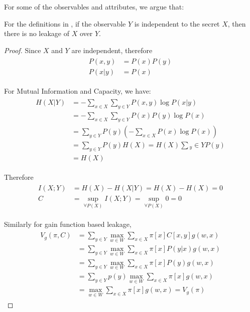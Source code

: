 For some of the observables and attributes, we argue that:

\begin{theorem} \label{Te: IR}
For the definitions in , if the observable $Y$ is independent to the secret $X$, then there is no leakage of $X$ over $Y$.
\end{theorem}

\begin{proof}
	Since $X$ and $Y$ are independent, therefore
	\begin{eqnarray*}
		\begin{aligned}
			P(x,y) &= P(x)P(y) \\
			P(x|y) &= P(x)
		\end{aligned}
	\end{eqnarray*}

	For Mutual Information and Capacity, we have:
	\begin{eqnarray*}
		\begin{aligned}
			H(X|Y) 
			&= - \sum_{x \in X} \sum_{y \in Y} P(x,y)\log{P(x|y)} \\
			&= - \sum_{x \in X} \sum_{y \in Y} P(x)P(y)\log{P(x)} \\
			&= \sum_{y \in Y} P(y) (- \sum_{x \in X}P(x)\log{P(x)}) \\
			&= \sum_{y \in Y} P(y) H(X) = H(X) \sum{_y \in Y} P(y) \\
			&= H(X)
		\end{aligned}
	\end{eqnarray*}
	
	Therefore
	\begin{eqnarray*}
		\begin{aligned}
			I(X;Y) &= H(X) - H(X|Y) = H(X) - H(X) = 0 \\
			C &= \sup_{\forall P(X)} I(X;Y) = \sup_{\forall P(X)} 0 = 0
		\end{aligned}
	\end{eqnarray*}
	
	Similarly for gain function based leakage\cite{GLeakage},
	\begin{eqnarray*}
		\begin{aligned}
			V_{g}(\pi, C) 
			&= \sum_{y \in Y}{\max_{w \in W}\sum_{x \in X}{\pi[x]C[x,y]g(w,x)}} \\
			&= \sum_{y \in Y}{\max_{w \in W}\sum_{x \in X}{\pi[x]P(y|x)g(w,x)}} \\
			&= \sum_{y \in Y}{\max_{w \in W}\sum_{x \in X}{\pi[x]P(y)g(w,x)}} \\
			&= \sum_{y \in Y}p(y){\max_{w \in W}\sum_{x \in X}{\pi[x]g(w,x)}} \\
			&= \max_{w \in W}\sum_{x \in X}{\pi[x]g(w,x)} = V_{g}(\pi)
		\end{aligned}
	\end{eqnarray*}
	

\end{proof}
